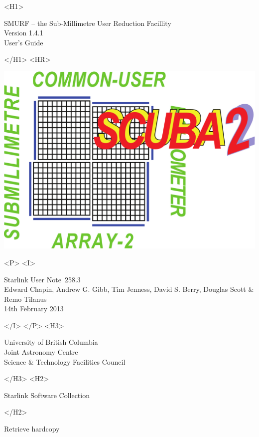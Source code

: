 \documentclass[twoside,11pt]{article}
\newcommand{\stardoccategory}  {Starlink User Note}
\newcommand{\stardocsource}    {sun\stardocnumber}
\newcommand{\stardocnumber}    {258.3}
\newcommand{\stardocauthors}   {Edward Chapin, Andrew G. Gibb, Tim Jenness, David S. Berry, Douglas Scott \& Remo Tilanus}
\newcommand{\stardocdate}      {14th February 2013}
\newcommand{\stardoctitle}     {SMURF -- the Sub-Millimetre User Reduction Facillity}
\newcommand{\stardocversion}   {Version 1.4.1}
\newcommand{\stardocmanual}    {User's Guide}
\newcommand{\htmladdnormallink}[2]{#1}
\newcommand{\htmladdimg}[1]{}
\newcommand{\xlabel}[1]{}
\renewcommand{\_}{\texttt{\symbol{95}}}
\begin{document}
\begin{htmlonly}
   \xlabel{}
   \begin{rawhtml} <H1> \end{rawhtml}
      \stardoctitle\\
      \stardocversion\\
      \stardocmanual
   \begin{rawhtml} </H1> <HR> \end{rawhtml}

\includegraphics[scale=0.7]{sun258_logo}

   \begin{rawhtml} <P> <I> \end{rawhtml}
   \stardoccategory\ \stardocnumber \\
   \stardocauthors \\
   \stardocdate
   \begin{rawhtml} </I> </P> <H3> \end{rawhtml}
      \htmladdnormallink{University of British Columbia}
                        {http://www.ubc.ca} \\
      \htmladdnormallink{Joint Astronomy Centre}
                        {http://www.jach.hawaii.edu}\\
      \htmladdnormallink{Science \& Technology Facilities Council}
                        {http://www.stfc.ac.uk} \\
   \begin{rawhtml} </H3> <H2> \end{rawhtml}
      \htmladdnormallink{Starlink Software Collection}{http://starlink.jach.hawaii.edu/}
   \begin{rawhtml} </H2> \end{rawhtml}
   \htmladdnormallink{\htmladdimg{source.gif} Retrieve hardcopy}
      {http://starlink.jach.hawaii.edu/cgi-bin/hcserver?\stardocsource}\\


\end{htmlonly}
\end{document}
